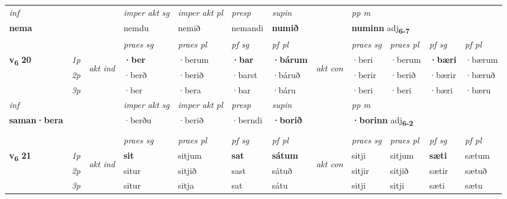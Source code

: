 \begin{longtable}[l]{X>{\footnotesize\itshape}llXXXXlXXXX}
   {\textit{inf}} & &  & \textit{imper akt sg} & \textit{imper akt pl}   & \textit{presp} & \textit{supin}  && \textit{pp m} \\*
  {\textbf{nema}} & && nemdu  & nemið   & nemandi &  \textbf{numið}  && \multicolumn{2}{l}{\textbf{numinn} adj\textbf{\textsubscript{6-7}}} \\*

\midrule

 & &   & \textit{praes sg}  & \textit{praes pl}    & \textit{ pf sg} & \textit{pf pl} & & \textit{praes sg}  & \textit{praes pl}    & \textit{pf sg} & \textit{pf pl }  \\ \cmidrule{4-7} \cmidrule{9-12}
 \multirow{2}{*}{{{\textbf{v{\textsubscript{6}}} \Large{\textbf{20}}}}}  & 1p & \multirow{3}{*}{\begin{turn}{90}\textit{akt ind}\end{turn}} & \textbf{·ber} & ·berum & \textbf{·bar} & \textbf{·bárum} & \multirow{3}{*}{\begin{turn}{90}\textit{akt con}\end{turn}} &·beri & ·berum & \textbf{·bæri} & ·bærum\\*
 & 2p &  &  ·berð  & ·berið & ·barst & ·báruð & & ·berir & ·berið & ·bærir & ·bæruð \\*
 & 3p &  & ·ber & ·bera & ·bar & ·báru & & ·beri & ·beri& ·bæri & ·bæru \\*
\cmidrule{4-7} \cmidrule{9-12}

   {\textit{inf}} & &  & \textit{imper akt sg} & \textit{imper akt pl}   & \textit{presp} & \textit{supin}  && \textit{pp m} \\*
  {\textbf{saman\allowbreak ·bera}} & && ·berðu  & ·berið   & ·berndi &  \textbf{·borið}  && \multicolumn{2}{l}{\textbf{·borinn} adj\textbf{\textsubscript{6-2}}} \\*

\midrule
  & \\
   \midrule
 & &   & \textit{praes sg}  & \textit{praes pl}    & \textit{ pf sg} & \textit{pf pl} & & \textit{praes sg}  & \textit{praes pl}    & \textit{pf sg} & \textit{pf pl }  \\ \cmidrule{4-7} \cmidrule{9-12}
 \multirow{2}{*}{{{\textbf{v{\textsubscript{6}}} \Large{\textbf{21}}}}}  & 1p & \multirow{3}{*}{\begin{turn}{90}\textit{akt ind}\end{turn}} & \textbf{sit} & sitjum & \textbf{sat} & \textbf{sátum} & \multirow{3}{*}{\begin{turn}{90}\textit{akt con}\end{turn}} &sitji & sitjum & \textbf{sæti} & sætum\\*
 & 2p &  &  situr  & sitjið & sast & sátuð & & sitjir & sitjið & sætir & sætuð \\*
 & 3p &  & situr & sitja & sat & sátu & & sitji & sitji& sæti & sætu \\*
\cmidrule{4-7} \cmidrule{9-12}


\end{longtable}
